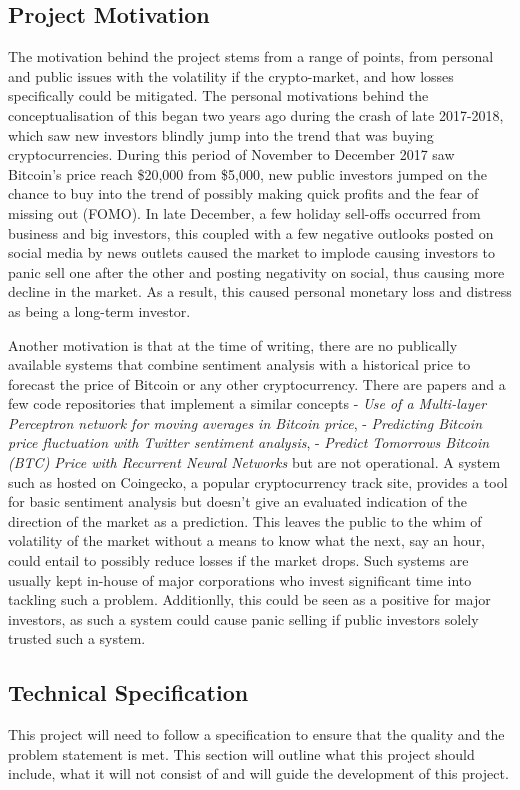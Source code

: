 \documentclass[oneside, 12pt]{article}
\begin{document}
		\subsection{Project Motivation}
		The motivation behind the project stems from a range of points, from personal and public issues with the volatility if the crypto-market, and how losses specifically could be mitigated. The personal motivations behind the conceptualisation of this began two years ago during the crash of late 2017-2018, which saw new investors blindly jump into the trend that was buying cryptocurrencies. During this period of November to December 2017 saw Bitcoin's price reach \$20,000 from \$5,000, new public investors jumped on the chance to buy into the trend of possibly making quick profits and the fear of missing out (FOMO). In late December, a few holiday sell-offs occurred from business and big investors, this coupled with a few negative outlooks posted on social media by news outlets caused the market to implode causing investors to panic sell one after the other and posting negativity on social, thus causing more decline in the market. As a result, this caused personal monetary loss and distress as being a long-term investor.
		
		Another motivation is that at the time of writing, there are no publically available systems that combine sentiment analysis with a historical price to forecast the price of Bitcoin or any other cryptocurrency. There are papers and a few code repositories that implement a similar concepts \cite{2} - \textit{Use of a Multi-layer Perceptron network for moving averages in Bitcoin price}, \cite{3} - \textit{Predicting Bitcoin price fluctuation with Twitter sentiment analysis}, \cite{4} - \textit{Predict Tomorrows Bitcoin (BTC) Price with Recurrent Neural Networks} but are not operational. A system such as \cite{1} hosted on Coingecko, a popular cryptocurrency track site, provides a tool for basic sentiment analysis but doesn't give an evaluated indication of the direction of the market as a prediction. This leaves the public to the whim of volatility of the market without a means to know what the next, say an hour, could entail to possibly reduce losses if the market drops. Such systems are usually kept in-house of major corporations who invest significant time into tackling such a problem. Additionlly, this could be seen as a positive for major investors, as such a system could cause panic selling if public investors solely trusted such a system.
			
		\newpage
		\subsection{Technical Specification}
		This project will need to follow a specification to ensure that the quality and the problem statement is met. This section will outline what this project should include, what it will not consist of and will guide the development of this project.
		\newline
		
\end{document}
